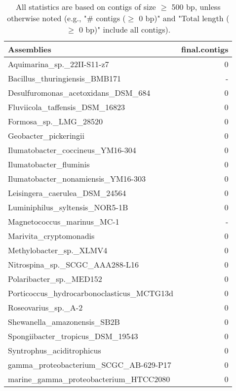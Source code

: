 \documentclass[12pt,a4paper]{article}
\begin{document}
\begin{table}[ht]
\begin{center}
\caption{All statistics are based on contigs of size $\geq$ 500 bp, unless otherwise noted (e.g., "\# contigs ($\geq$ 0 bp)" and "Total length ($\geq$ 0 bp)" include all contigs).}
\begin{tabular}{|l*{1}{|r}|}
\hline
Assemblies & final.contigs \\ \hline
Aquimarina\_sp.\_22II-S11-z7 & 0 \\ \hline
Bacillus\_thuringiensis\_BMB171 & - \\ \hline
Desulfuromonas\_acetoxidans\_DSM\_684 & 0 \\ \hline
Fluviicola\_taffensis\_DSM\_16823 & 0 \\ \hline
Formosa\_sp.\_LMG\_28520 & 0 \\ \hline
Geobacter\_pickeringii & 0 \\ \hline
Ilumatobacter\_coccineus\_YM16-304 & 0 \\ \hline
Ilumatobacter\_fluminis & 0 \\ \hline
Ilumatobacter\_nonamiensis\_YM16-303 & 0 \\ \hline
Leisingera\_caerulea\_DSM\_24564 & 0 \\ \hline
Luminiphilus\_syltensis\_NOR5-1B & 0 \\ \hline
Magnetococcus\_marinus\_MC-1 & - \\ \hline
Marivita\_cryptomonadis & 0 \\ \hline
Methylobacter\_sp.\_XLMV4 & 0 \\ \hline
Nitrospina\_sp.\_SCGC\_AAA288-L16 & 0 \\ \hline
Polaribacter\_sp.\_MED152 & 0 \\ \hline
Porticoccus\_hydrocarbonoclasticus\_MCTG13d & 0 \\ \hline
Roseovarius\_sp.\_A-2 & 0 \\ \hline
Shewanella\_amazonensis\_SB2B & 0 \\ \hline
Spongiibacter\_tropicus\_DSM\_19543 & 0 \\ \hline
Syntrophus\_aciditrophicus & 0 \\ \hline
gamma\_proteobacterium\_SCGC\_AB-629-P17 & 0 \\ \hline
marine\_gamma\_proteobacterium\_HTCC2080 & 0 \\ \hline
\end{tabular}
\end{center}
\end{table}
\end{document}
